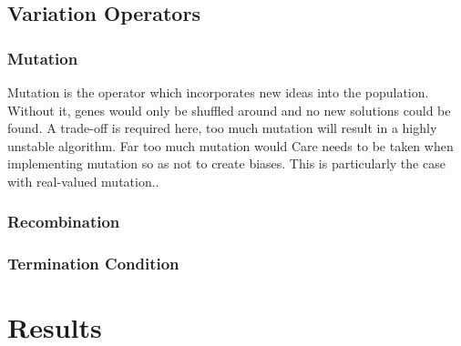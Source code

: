 \documentclass{article}
\begin{document}
\cite{multi_objective_bloat}


\subsection{Variation Operators}
\subsubsection{Mutation}
Mutation is the operator which incorporates new ideas into the population. Without it, genes would only be shuffled around and no new solutions could be found. %
A trade-off is required here, too much mutation will result in a highly unstable algorithm. Far too much mutation would %
Care needs to be taken when implementing mutation so as not to create biases. This is particularly the case with real-valued mutation.. %

\subsubsection{Recombination}



\subsubsection{Termination Condition}

\section{Results} %

\end{document}
